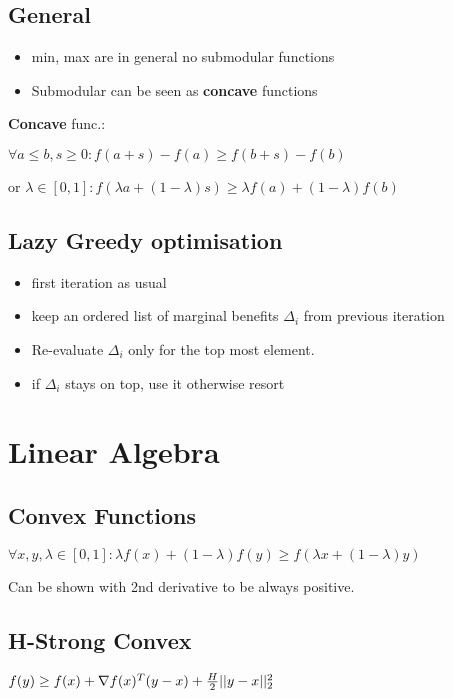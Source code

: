 \documentclass[a4paper,11pt,twocolumn]{article}
\begin{document}
\subsection{General}
\begin{itemize}[noitemsep,topsep=0pt,parsep=0pt,partopsep=0pt]
\item min, max are in general no submodular functions
\item Submodular can be seen as \textbf{concave} functions
\end{itemize} 

\textbf{Concave} func.: 

$\forall a \leq b, s \geq 0 : f(a+s)- f(a) \geq f(b+s) -f(b)$

or $\lambda \in [0,1]: f(\lambda a+ (1-\lambda)s) \geq \lambda f(a) + (1-\lambda) f(b)$

\subsection{Lazy Greedy optimisation}
\begin{itemize}[noitemsep,topsep=0pt,parsep=0pt,partopsep=0pt]
\item first iteration as usual
\item keep an ordered list of marginal benefits $\Delta_i$ from previous iteration
\item 	Re-evaluate $\Delta_i$ only for the top most element.
\item if $\Delta_i$ stays on top, use it otherwise resort
\end{itemize}



\section{Linear Algebra}

\subsection{Convex Functions}
$\forall x,y, \lambda \in [0,1] : \lambda f(x) + (1-\lambda)f(y) \geq f(\lambda x +  (1-\lambda) y)$

Can be shown with 2nd derivative to be always positive.

\subsection{H-Strong Convex}
$f(y) \geq f(x) + \nabla f(x)^T(y-x) + {H \over 2 } || y - x ||_2^2$
\end{document}
